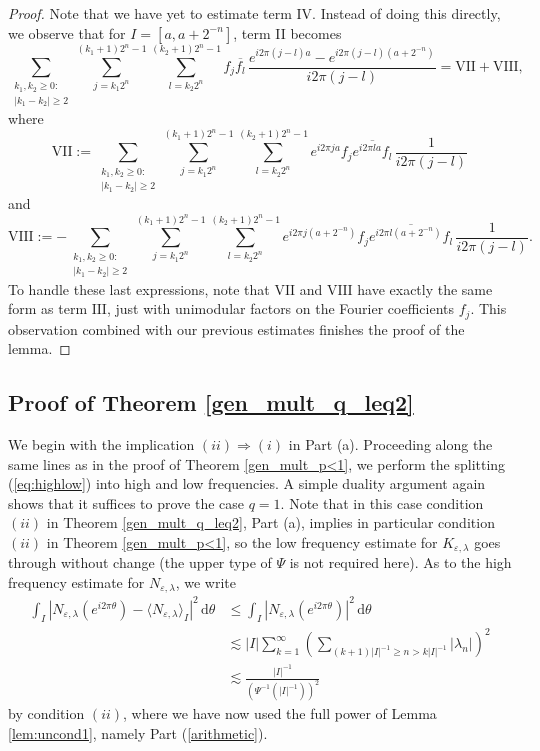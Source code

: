 \documentclass[a4paper, leqno, 10pt]{amsart}
\numberwithin{equation}{section}
\newcommand{\dd}{\mathrm{d}}
\newcommand{\eps}{\varepsilon}
\begin{document}
\begin{proof}
Note that we have yet to estimate term IV. Instead of doing this directly, we observe that for $I = [a, a+ 2^{-n}]$, term II becomes
\[ 
\sum_{\substack{k_1, k_2 \geq 0:\\ |k_1-k_2| \geq 2}}
\sum_{j=k_1 2^{n}}^{(k_1+1)2^{n}-1} \sum_{l=k_2 2^n}^{(k_2 +1) 2^{n}-1} f_j \overline{f_l} \, 
\frac{e^{i 2 \pi (j-l)a} - e^{i 2 \pi (j-l) (a+2^{-n})}}{i 2\pi (j-l)} = \text{VII} + \text{VIII},
\]
where
\[
\text{VII} := \sum_{\substack{k_1, k_2 \geq 0:\\ |k_1-k_2| \geq 2}}
\sum_{j=k_1 2^{n}}^{(k_1+1)2^{n}-1} \sum_{l=k_2 2^n}^{(k_2 +1) 2^{n}-1} e^{i 2 \pi j a} f_j \overline{e^{i 2 \pi l a} f_l} \, 
    \frac{1}{i 2\pi (j-l)}
\]
and
\[
\text{VIII} := - \sum_{\substack{k_1, k_2 \geq 0:\\ |k_1-k_2| \geq 2}}
\sum_{j=k_1 2^{n}}^{(k_1+1)2^{n}-1} \sum_{l=k_2 2^n}^{(k_2 +1) 2^{n}-1} e^{i 2 \pi j (a + 2^{-n})} f_j \overline{e^{i 2 \pi l (a+ 2^{-n})} f_l} \, 
\frac{1}{i 2\pi (j-l)} .
\]
To handle these last expressions, note that $\text{VII}$ and $\text{VIII}$ have exactly the same form as term $\text{III}$, just with unimodular factors on the Fourier coefficients $f_j$. This observation combined with our previous estimates finishes the proof of the lemma. \end{proof}

%
%
\subsection{Proof of Theorem \ref{gen_mult_q_leq2}}
We begin with the implication $(ii) \Rightarrow (i)$ in Part (a). Proceeding along the same lines as in the proof of Theorem \ref{gen_mult_p<1}, we perform the splitting (\ref{eq:highlow}) into high and low frequencies. A simple duality argument again shows that it suffices to prove the case $q=1$. Note that in this case condition $(ii)$ in Theorem \ref{gen_mult_q_leq2}, Part (a), implies in particular condition $(ii)$ in Theorem \ref{gen_mult_p<1}, so the low frequency estimate for $K_{\eps, \lambda}$ goes through without change (the upper type of $\Psi$
is not required here). As to the high frequency estimate for 
$N_{\eps, \lambda}$, we write
\begin{align*}  
\int_I \left| N_{\eps, \lambda}(e^{i 2 \pi \theta}) - \langle N_{\eps, \lambda} \rangle_I \right|^2 \, \dd \theta
&\leq  \int_I \left| N_{\eps, \lambda}(e^{i 2 \pi \theta})  \right|^2 \, \dd \theta\\
& \lesssim |I| \sum_{k=1}^{\infty} \left( \sum_{(k+1)|I|^{-1} \geq n > k|I|^{-1}} |\lambda_n| \right)^2 \\
& \lesssim \frac{|I|^{-1}}{( \Psi^{-1}(|I|^{-1}))^2} 
\end{align*}
by condition $(ii)$, where we have now used the full power of Lemma \ref{lem:uncond1}, namely Part (\ref{arithmetic}).
  
\end{document}
